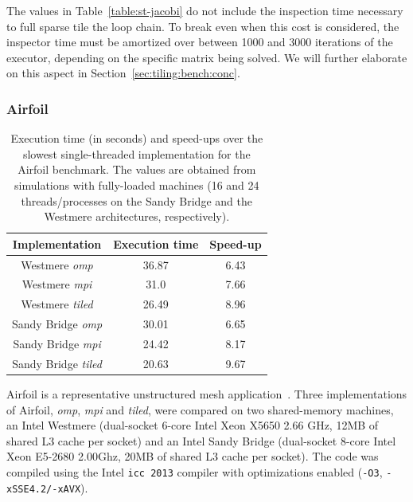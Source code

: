 
The values in Table~\ref{table:st-jacobi} do not include the inspection time necessary to full sparse tile the loop chain. To break even when this cost is considered, the inspector time must be amortized over between 1000 and 3000 iterations of the executor, depending on the specific matrix being solved. We will further elaborate on this aspect in Section~\ref{sec:tiling:bench:conc}.



\subsubsection{Airfoil}


\begin{table}[t]
\centering
\begin{tabulary}{1.0\columnwidth}{c | c | c}
\hline
Implementation & Execution time & Speed-up \\
\hline
Westmere {\em omp} & 36.87 & 6.43\\
Westmere {\em mpi} & 31.0 & 7.66 \\
Westmere {\em tiled} & 26.49 & 8.96 \\
\hline \hline
Sandy Bridge {\em omp} & 30.01 & 6.65 \\
Sandy Bridge {\em mpi} & 24.42 & 8.17 \\
Sandy Bridge {\em tiled} & 20.63 & 9.67 \\
\hline
\end{tabulary}
\caption{Execution time (in seconds) and speed-ups over the slowest single-threaded implementation for the Airfoil benchmark. The values are obtained from simulations with fully-loaded machines (16 and 24 threads/processes on the Sandy Bridge and the Westmere architectures, respectively).}
\label{table:st-airfoil}
\end{table}

Airfoil is a representative unstructured mesh application~\cite{AIRFOIL}. Three implementations of Airfoil, {\em omp}, {\em mpi} and {\em tiled}, were compared on two shared-memory machines, an Intel Westmere (dual-socket 6-core Intel Xeon X5650 2.66 GHz, 12MB of shared L3 cache per socket) and an Intel Sandy Bridge (dual-socket 8-core Intel Xeon E5-2680 2.00Ghz, 20MB of shared L3 cache per socket). The code was compiled using the Intel \texttt{icc 2013} compiler with optimizations enabled (\texttt{-O3}, \texttt{-xSSE4.2/-xAVX}).

